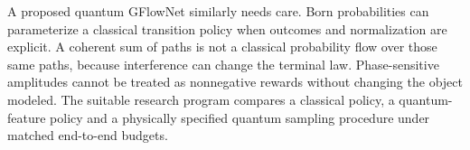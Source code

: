 A proposed quantum GFlowNet similarly needs care. Born probabilities can parameterize a classical transition policy when outcomes and normalization are explicit. A coherent sum of paths is not a classical probability flow over those same paths, because interference can change the terminal law. Phase-sensitive amplitudes cannot be treated as nonnegative rewards without changing the object modeled. The suitable research program compares a classical policy, a quantum-feature policy and a physically specified quantum sampling procedure under matched end-to-end budgets.
